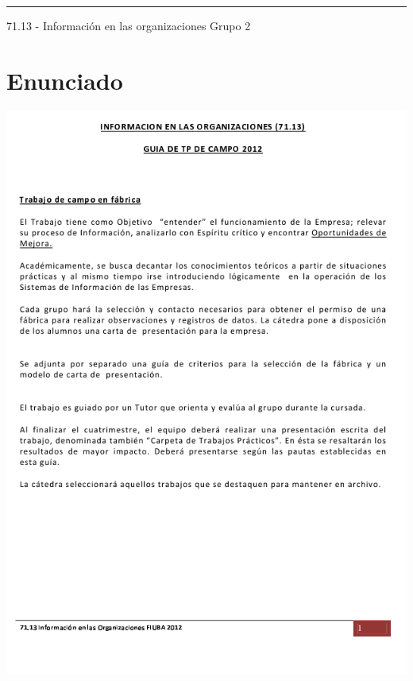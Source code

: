 \documentclass[12pt,titlepage]{report}
\begin{document}
\begin{titlepage}
\vfill

\hrule
\vspace{0.2cm}

\noindent\small{71.13 - Información en las organizaciones \hfill Grupo 2}

\end{titlepage}



\setcounter{page}{1}

\tableofcontents
\newpage



\chapter*{Enunciado}
\begin{center}
 \includegraphics[keepaspectratio=true]{./Images/pagina1-guia.png}
\end{center}

\end{document}
